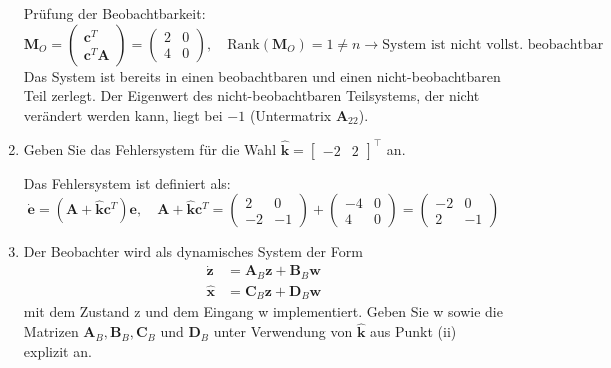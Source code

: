 \documentclass[crop=false]{standalone}
\begin{document}
\begin{task}
\begin{enumerate}[i]
\begin{solution}
Prüfung der Beobachtbarkeit:
\[\mathbf{M}_O = 
     \begin{pmatrix} \mathbf{c}^T \\ \mathbf{c}^T \mathbf{A} \end{pmatrix} = 
     \begin{pmatrix} 2 & 0 \\ 4 & 0  \end{pmatrix}, \quad
     \text{Rank}\left(\mathbf{M}_O\right) = 1 \neq n \rightarrow \text{System ist nicht vollst. beobachtbar}
\]
Das System ist bereits in einen beobachtbaren und einen nicht-beobachtbaren Teil zerlegt. 
Der Eigenwert des nicht-beobachtbaren Teilsystems, der nicht verändert werden kann, liegt bei $-1$ (Untermatrix $\mathbf{A}_{22}$).
\end{solution}
\item Geben Sie das Fehlersystem für die Wahl $\hat{\mathbf{k}}=\left[\begin{array}{cc}{-2} & {2}\end{array}\right]^{\top}$ an.
\begin{solution}
Das Fehlersystem ist definiert als:
\[ 
\dot{\mathbf{e}}=\left(\mathbf{A}+\hat{\mathbf{k}} \mathbf{c}^{T}\right) \mathbf{e},
\quad \mathbf{A}+\hat{\mathbf{k}} \mathbf{c}^{T} = 
\begin{pmatrix}
2 & 0 \\
-2 & -1
\end{pmatrix} +
\begin{pmatrix}
-4 & 0 \\
4 & 0
\end{pmatrix}
=
\begin{pmatrix}
-2 & 0 \\
2 & -1
\end{pmatrix}
 \]
\end{solution}
\item Der Beobachter wird als dynamisches System der Form
\[\begin{aligned} \dot{\mathbf{z}} &=\mathbf{A}_{B} \mathbf{z}+\mathbf{B}_{B} \mathbf{w} \\ \hat{\mathbf{x}} &=\mathbf{C}_{B} \mathbf{z}+\mathbf{D}_{B} \mathbf{w} \end{aligned}\]
mit dem Zustand z und dem Eingang w implementiert. Geben Sie w sowie die
Matrizen $\mathbf{A}_{B}, \mathbf{B}_{B}, \mathbf{C}_{B}$ und $\mathbf{D}_{B}$ unter Verwendung von $\hat{\mathbf{k}}$ aus Punkt (ii) explizit
an.


\end{enumerate}
\end{task}
\end{document}
